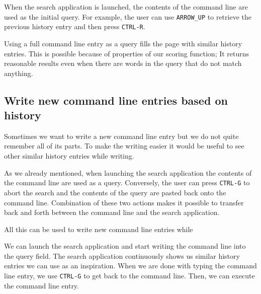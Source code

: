 When the search application is launched, the contents of the command line are used as the initial query. For example, the user can use \verb|ARROW_UP| to retrieve the previous history entry and then press \verb|CTRL-R|. 

Using a full command line entry as a query fills the page with similar history entries. This is possible because of properties of our scoring function; It returns reasonable results even when there are words in the query that do not match anything. 

\subsection{Write new command line entries based on history}

Sometimes we want to write a new command line entry but we do not quite remember all of its parts. To make the writing easier it would be useful to see other similar history entries while writing.

As we already mentioned, when launching the search application the contents of the command line are used as a query. Conversely, the user can press \verb|CTRL-G| to abort the search and the contents of the query are pasted back onto the command line.
Combination of these two actions makes it possible to transfer back and forth between the command line and the search application. 

All this can be used to write new command line entries while

We can launch the search application and start writing the command line into the query field. The search application continuously shows us similar history entries we can use as an inspiration. When we are done with typing the command line entry, we use \verb|CTRL-G| to get back to the command line. Then, we can execute the command line entry.



